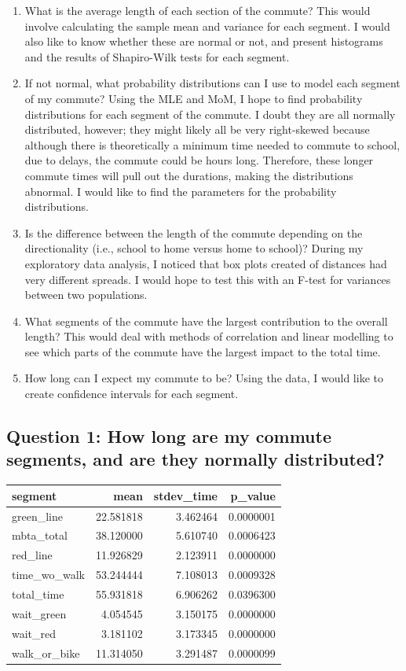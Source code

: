 \documentclass[
]{article}
\providecommand{\tightlist}{%
  \setlength{\itemsep}{0pt}\setlength{\parskip}{0pt}}
\begin{document}
\begin{enumerate}
\def\labelenumi{\arabic{enumi}.}
\tightlist
\item
  What is the average length of each section of the commute? This would
  involve calculating the sample mean and variance for each segment. I
  would also like to know whether these are normal or not, and present
  histograms and the results of Shapiro-Wilk tests for each segment.
\item
  If not normal, what probability distributions can I use to model each
  segment of my commute? Using the MLE and MoM, I hope to find
  probability distributions for each segment of the commute. I doubt
  they are all normally distributed, however; they might likely all be
  very right-skewed because although there is theoretically a minimum
  time needed to commute to school, due to delays, the commute could be
  hours long. Therefore, these longer commute times will pull out the
  durations, making the distributions abnormal. I would like to find the
  parameters for the probability distributions.
\item
  Is the difference between the length of the commute depending on the
  directionality (i.e., school to home versus home to school)? During my
  exploratory data analysis, I noticed that box plots created of
  distances had very different spreads. I would hope to test this with
  an F-test for variances between two populations.
\item
  What segments of the commute have the largest contribution to the
  overall length? This would deal with methods of correlation and linear
  modelling to see which parts of the commute have the largest impact to
  the total time.
\item
  How long can I expect my commute to be? Using the data, I would like
  to create confidence intervals for each segment.
\end{enumerate}

\hypertarget{question-1-how-long-are-my-commute-segments-and-are-they-normally-distributed}{%
\subsection{Question 1: How long are my commute segments, and are they
normally
distributed?}\label{question-1-how-long-are-my-commute-segments-and-are-they-normally-distributed}}

\begin{longtable}[]{@{}lrrr@{}}
\toprule
segment & mean & stdev\_time & p\_value\tabularnewline
\midrule
\endhead
green\_line & 22.581818 & 3.462464 & 0.0000001\tabularnewline
mbta\_total & 38.120000 & 5.610740 & 0.0006423\tabularnewline
red\_line & 11.926829 & 2.123911 & 0.0000000\tabularnewline
time\_wo\_walk & 53.244444 & 7.108013 & 0.0009328\tabularnewline
total\_time & 55.931818 & 6.906262 & 0.0396300\tabularnewline
wait\_green & 4.054545 & 3.150175 & 0.0000000\tabularnewline
wait\_red & 3.181102 & 3.173345 & 0.0000000\tabularnewline
walk\_or\_bike & 11.314050 & 3.291487 & 0.0000099\tabularnewline
\bottomrule
\end{longtable}
\end{document}
